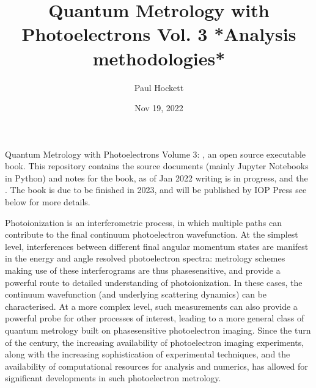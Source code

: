 \documentclass[letterpaper,10pt,english]{jupyterBook}
\title{Quantum Metrology with Photoelectrons Vol. 3 *Analysis methodologies*}
\date{Nov 19, 2022}
\author{Paul Hockett}
\begin{document}
\pagestyle{empty}
\sphinxmaketitle
\pagestyle{plain}
\sphinxtableofcontents
\pagestyle{normal}
\label{\detokenize{intro::doc}}


\sphinxAtStartPar
Quantum Metrology with Photoelectrons Volume 3: , an open source executable book. This repository contains the source documents (mainly Jupyter Notebooks in Python) and notes for the book, as of Jan 2022 writing is in progress, and the . The book is due to be finished in 2023, and will be published by IOP Press \sphinxhyphen{} see below for more details.

\begin{DUlineblock}{0em}
\item[] 
\end{DUlineblock}

\sphinxAtStartPar
Photoionization is an interferometric process, in which multiple paths can contribute to the final continuum photoelectron wavefunction. At the simplest level, interferences between different final angular momentum states are manifest in the energy and angle resolved photoelectron spectra: metrology schemes making use of these interferograms are thus phase\sphinxhyphen{}sensitive, and provide a powerful route to detailed understanding of photoionization. In these cases, the continuum wavefunction (and underlying scattering dynamics) can be characterised. At a more complex level, such measurements can also provide a powerful probe for other processes of interest, leading to a more general class of quantum metrology built on phase\sphinxhyphen{}sensitive photoelectron imaging.  Since the turn of the century, the increasing availability of photoelectron imaging experiments, along with the increasing sophistication of experimental techniques, and the availability of computational resources for analysis and numerics, has allowed for significant developments in such photoelectron metrology.

\begin{DUlineblock}{0em}
\item[] 
\end{DUlineblock}
\end{document}
